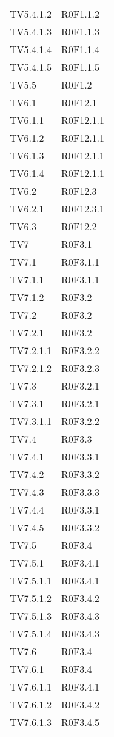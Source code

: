 \documentclass[PianoDiQualifica.tex]{subfiles}
\begin{document}
\begin{longtable}[H]{P{6.5cm}P{7cm}}
	TV5.4.1.2  & R0F1.1.2 \\ 
	TV5.4.1.3  & R0F1.1.3 \\ 
	TV5.4.1.4  & R0F1.1.4 \\ 
	TV5.4.1.5  & R0F1.1.5 \\ 
	TV5.5  & R0F1.2 \\ 
	TV6.1  & R0F12.1 \\ 
	TV6.1.1  & R0F12.1.1 \\ 
	TV6.1.2  & R0F12.1.1 \\ 
	TV6.1.3  & R0F12.1.1 \\ 
	TV6.1.4  & R0F12.1.1 \\ 
	TV6.2  & R0F12.3 \\ 
	TV6.2.1  & R0F12.3.1 \\ 
	TV6.3 &  R0F12.2 \\ 
	TV7  & R0F3.1 \\ 
	TV7.1  & R0F3.1.1 \\ 
	TV7.1.1  & R0F3.1.1 \\ 
	TV7.1.2  & R0F3.2 \\ 
	TV7.2  & R0F3.2 \\ 
	TV7.2.1  & R0F3.2 \\ 
	TV7.2.1.1  & R0F3.2.2 \\ 
	TV7.2.1.2  & R0F3.2.3 \\ 
	TV7.3  & R0F3.2.1 \\ 
	TV7.3.1  & R0F3.2.1 \\ 
	TV7.3.1.1  & R0F3.2.2 \\ 
	TV7.4  & R0F3.3 \\ 
	TV7.4.1  & R0F3.3.1 \\ 
	TV7.4.2  & R0F3.3.2 \\ 
	TV7.4.3  & R0F3.3.3 \\ 
	TV7.4.4  & R0F3.3.1 \\ 
	TV7.4.5  & R0F3.3.2 \\ 
	TV7.5  & R0F3.4 \\ 
	TV7.5.1  & R0F3.4.1 \\ 
	TV7.5.1.1  & R0F3.4.1 \\ 
	TV7.5.1.2  & R0F3.4.2 \\ 
	TV7.5.1.3 & R0F3.4.3\\ 
	TV7.5.1.4 & R0F3.4.3 \\ 
	TV7.6  & R0F3.4 \\ 
	TV7.6.1  & R0F3.4 \\ 
	TV7.6.1.1  & R0F3.4.1 \\ 
	TV7.6.1.2  & R0F3.4.2 \\ 
	TV7.6.1.3 & R0F3.4.5 \\ 

\end{longtable}
\end{document}
